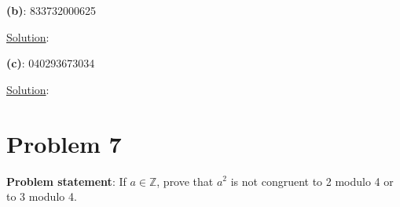 \documentclass{article} %
\begin{document}
\textbf{(b)}: 833732000625
\\
\begin{addmargin}[1em]{0em}
\underline{Solution}: 
\begin{addmargin}[1em]{0em}

\end{addmargin}
\begin{addmargin}[1em]{0em}
\end{addmargin}
\end{addmargin}

\textbf{(c)}: 040293673034
\\
\begin{addmargin}[1em]{0em}
\underline{Solution}: 
\begin{addmargin}[1em]{0em}

\end{addmargin}
\begin{addmargin}[1em]{0em}
\end{addmargin}
\end{addmargin}

\newpage

\section*{Problem 7}


\textbf{Problem statement}: If $a \in \mathbb{Z}$, prove that $a^2$ is not congruent to 2 modulo 4 or to 3 modulo 4.
\\
\end{document}
